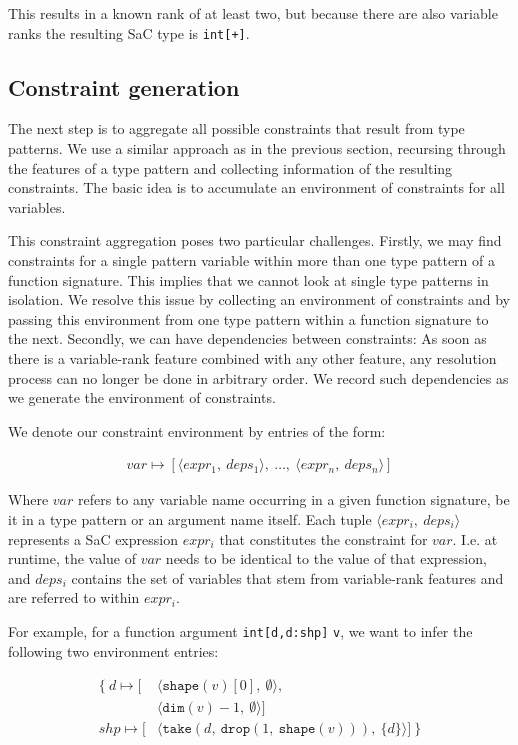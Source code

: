 \documentclass[sigconf,screen]{acmart}
\begin{document}
This results in a known rank of at least two, but because there are also variable ranks the resulting SaC type is \texttt{int[+]}.

\subsection{Constraint generation}
The next step is to aggregate all possible constraints that result from type patterns.
We use a similar approach as in the previous section, recursing through the features of a type pattern and collecting information of the resulting constraints.
The basic idea is to accumulate an environment of constraints for all variables.

This constraint aggregation poses two particular challenges.
Firstly, we may find constraints for a single pattern variable within more than one type pattern of a function signature.
This implies that we cannot look at single type patterns in isolation.
We resolve this issue by collecting an environment of constraints and by passing this environment from one type pattern within a function signature to the next.
Secondly, we can have dependencies between constraints:
As soon as there is a variable-rank feature combined with any other feature, any resolution process can no longer be done in arbitrary order.
We record such dependencies as we generate the environment of constraints.

We denote our constraint environment by entries of the form:

\begin{align*}
    var \mapsto [\langle{}expr_1,\ deps_1\rangle,\ \dots,\ \langle{}expr_n,\ deps_n\rangle]
\end{align*}

Where $var$ refers to any variable name occurring in a given function signature, be it in a type pattern or an argument name itself.
Each tuple $\langle{} expr_i,\ deps_i \rangle$ represents a SaC expression $expr_i$ that constitutes the constraint for $var$.
I.e. at runtime, the value of $var$ needs to be identical to the value of that expression, and $deps_i$ contains the set of variables that stem from variable-rank features and are referred to within $expr_i$.

For example, for a function argument \texttt{int[d,d:shp]} \texttt{v}, we want to infer the following two environment entries:

\begin{align*}
    \mathbf{\{}\
        d   \mapsto [&\langle\texttt{shape}(v)[0],\ \emptyset\rangle, \\
                     &\langle\texttt{dim}(v)-1,\ \emptyset\rangle] \\
        shp \mapsto [&\langle\texttt{take}(d,\ \texttt{drop}(1,\ \texttt{shape}(v))),\ \{d\}\rangle]
    \ \mathbf{\}}
\end{align*}
\end{document}
